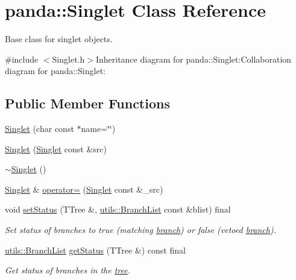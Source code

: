 \hypertarget{classpanda_1_1Singlet}{
\section{panda::Singlet Class Reference}
\label{classpanda_1_1Singlet}
}


Base class for singlet objects.  


{\ttfamily \#include $<$Singlet.h$>$}Inheritance diagram for panda::Singlet:Collaboration diagram for panda::Singlet:\subsection*{Public Member Functions}
\begin{DoxyCompactItemize}
\item 
\hyperlink{classpanda_1_1Singlet_a71f83291190ac2789a64d6238f6a5da8}{Singlet} (char const $\ast$name=\char`\"{}\char`\"{})
\item 
\hyperlink{classpanda_1_1Singlet_ab8bb799f35abdfff609be48acdc24a88}{Singlet} (\hyperlink{classpanda_1_1Singlet}{Singlet} const \&src)
\item 
\hyperlink{classpanda_1_1Singlet_ab40224b05d4f17461959fe352c4d1d29}{$\sim$Singlet} ()
\item 
\hyperlink{classpanda_1_1Singlet}{Singlet} \& \hyperlink{classpanda_1_1Singlet_a161b3df14c430fd7f1afdd64d098b211}{operator=} (\hyperlink{classpanda_1_1Singlet}{Singlet} const \&\_\-src)
\item 
void \hyperlink{classpanda_1_1Singlet_a7b38d2165f30ed45922939a806708602}{setStatus} (TTree \&, \hyperlink{classpanda_1_1utils_1_1BranchList}{utils::BranchList} const \&blist) final
\begin{DoxyCompactList}\small\item\em Set status of branches to true (matching \hyperlink{namespacepanda_1_1branch}{branch}) or false (vetoed \hyperlink{namespacepanda_1_1branch}{branch}). \item\end{DoxyCompactList}\item 
\hyperlink{classpanda_1_1utils_1_1BranchList}{utils::BranchList} \hyperlink{classpanda_1_1Singlet_a0d574c73f45883793b4ba0a84a14e2bd}{getStatus} (TTree \&) const final
\begin{DoxyCompactList}\small\item\em Get status of branches in the \hyperlink{namespacepanda_1_1tree}{tree}. \item\end{DoxyCompactList}\item 

\end{DoxyCompactItemize}
